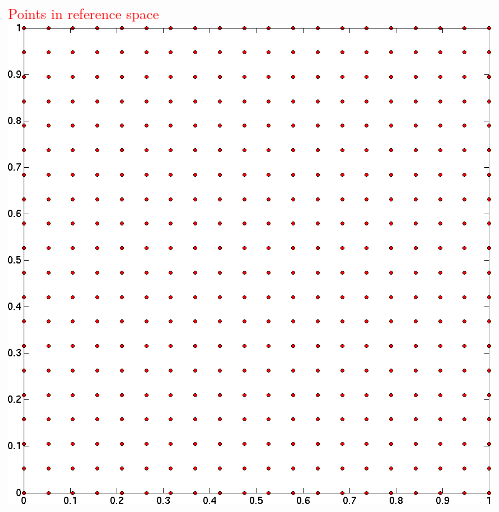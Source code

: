 \documentclass[8pt,xcolor=svgnames]{beamer}
\begin{document}
\begin{frame}
\begin{columns}
\begin{column}{0.35\textwidth}
  \end{column}
  \begin{column}{0.6\textwidth}
   \begin{columns}[t]
   \begin{column}{0.5\textwidth}
   \begin{center}
    \tiny{\textcolor{red}{Points in reference space}}
    \includegraphics[height=0.4\textheight,keepaspectratio=true]{./Images/Q2Points_Reference.png}
    

\end{center}
\end{column}
\end{columns}
\end{column}
\end{columns}
\end{frame}
\end{document}
